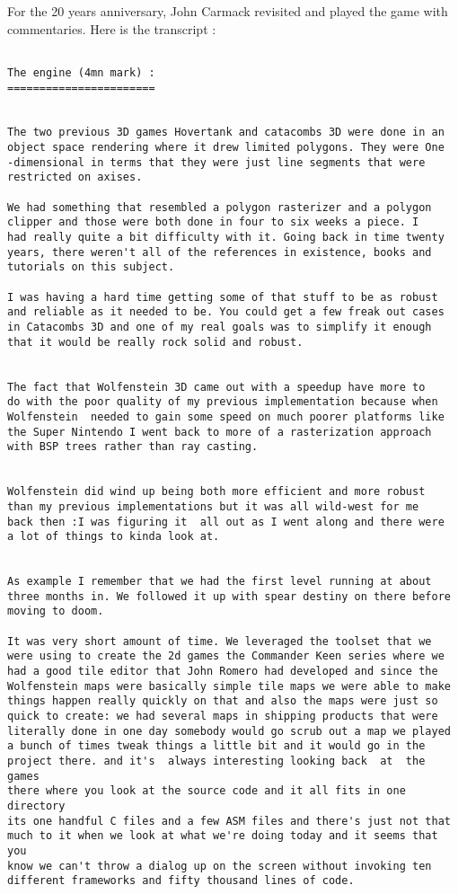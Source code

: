 \documentclass[book.tex]{subfiles}
\begin{document}
For the 20 years anniversary, John Carmack revisited and played the game with commentaries. Here is the transcript :

\begin{lstlisting}[breaklines=true,breakindent=0em]
   
The engine (4mn mark) :
=======================


The two previous 3D games Hovertank and catacombs 3D were done in an 
object space rendering where it drew limited polygons. They were One
-dimensional in terms that they were just line segments that were 
restricted on axises.

We had something that resembled a polygon rasterizer and a polygon 
clipper and those were both done in four to six weeks a piece. I 
had really quite a bit difficulty with it. Going back in time twenty
years, there weren't all of the references in existence, books and 
tutorials on this subject.

I was having a hard time getting some of that stuff to be as robust
and reliable as it needed to be. You could get a few freak out cases
in Catacombs 3D and one of my real goals was to simplify it enough
that it would be really rock solid and robust.


The fact that Wolfenstein 3D came out with a speedup have more to 
do with the poor quality of my previous implementation because when 
Wolfenstein  needed to gain some speed on much poorer platforms like
the Super Nintendo I went back to more of a rasterization approach 
with BSP trees rather than ray casting.


Wolfenstein did wind up being both more efficient and more robust 
than my previous implementations but it was all wild-west for me 
back then :I was figuring it  all out as I went along and there were
a lot of things to kinda look at.


As example I remember that we had the first level running at about
three months in. We followed it up with spear destiny on there before
moving to doom.

It was very short amount of time. We leveraged the toolset that we 
were using to create the 2d games the Commander Keen series where we 
had a good tile editor that John Romero had developed and since the 
Wolfenstein maps were basically simple tile maps we were able to make 
things happen really quickly on that and also the maps were just so 
quick to create: we had several maps in shipping products that were 
literally done in one day somebody would go scrub out a map we played 
a bunch of times tweak things a little bit and it would go in the 
project there. and it's  always interesting looking back  at  the games 
there where you look at the source code and it all fits in one directory 
its one handful C files and a few ASM files and there's just not that 
much to it when we look at what we're doing today and it seems that you 
know we can't throw a dialog up on the screen without invoking ten 
different frameworks and fifty thousand lines of code.




\end{lstlisting}
\end{document}
